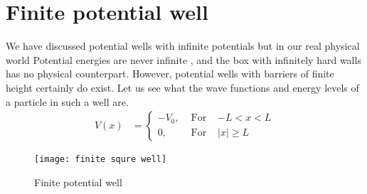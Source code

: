 \section{Finite potential well}

We have discussed potential wells with infinite potentials but in our real physical world 
Potential energies are never infinite , and the box with infinitely hard
walls  has no physical counterpart. However, potential wells
with barriers of finite height certainly do exist. Let us see what the wave functions and
energy levels of a particle in such a well are.
\begin{align*}
V(x)&=\left\{\begin{array}{ccc}
-V_{0}, & \text { For } & -L < x< L \\
0, & \text { For } & |x| \geq L
\end{array}\right.
\end{align*}
\begin{figure}[H]
	\centering
	\texttt{[image: finite squre well]}
	\caption{Finite potential well}
	\label{}
\end{figure}

